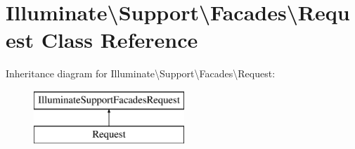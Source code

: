\hypertarget{class_illuminate_1_1_support_1_1_facades_1_1_request}{}\section{Illuminate\textbackslash{}Support\textbackslash{}Facades\textbackslash{}Request Class Reference}
\label{class_illuminate_1_1_support_1_1_facades_1_1_request}
Inheritance diagram for Illuminate\textbackslash{}Support\textbackslash{}Facades\textbackslash{}Request\+:\begin{figure}[H]
\begin{center}
\leavevmode
\includegraphics[height=2.000000cm]{class_illuminate_1_1_support_1_1_facades_1_1_request}
\end{center}
\end{figure}
